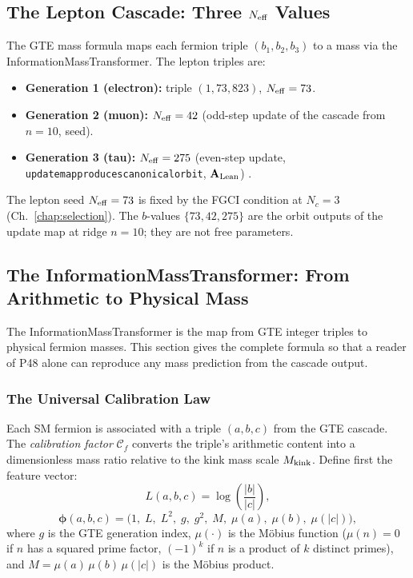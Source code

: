 \documentclass[11pt,openany]{book}
\theoremstyle{remark}
\newcommand{\lean}[1]{%
  \penalty-100
  \begingroup\def\_{\textunderscore\allowbreak}\texttt{#1}\endgroup}
\newcommand{\Mkink}{M_{\rm kink}}
\newcommand{\Nc}{N_c}
\newcommand{\CatAL}{\ensuremath{\textbf{A}_{\rm Lean}}}
\begin{document}
\subsection*{The Lepton Cascade: Three $N_{\rm eff}$ Values}

The GTE mass formula maps each fermion triple $(b_1, b_2, b_3)$ to a mass via the
InformationMassTransformer.  The lepton triples are:
\begin{itemize}[nosep]
\item \textbf{Generation 1 (electron):} triple $(1, 73, 823)$, $N_{\rm eff} = 73$.
\item \textbf{Generation 2 (muon):} $N_{\rm eff} = 42$ (odd-step update of the cascade
  from $n=10$, seed).
\item \textbf{Generation 3 (tau):} $N_{\rm eff} = 275$ (even-step update,
  \lean{update\_map\_produces\_canonical\_orbit}, \CatAL) \cite{Spivack2025UGP}.
\end{itemize}

The lepton seed $N_{\rm eff} = 73$ is fixed by the FGCI condition at $\Nc = 3$
(Ch.~\ref{chap:selection}).  The $b$-values $\{73, 42, 275\}$ are the orbit outputs
of the update map at ridge $n = 10$; they are not free parameters.

\subsection*{The InformationMassTransformer: From Arithmetic to Physical Mass}
\label{subsec:imt_formula}

The InformationMassTransformer is the map from GTE integer triples to physical fermion
masses.  This section gives the complete formula so that a reader of P48 alone can
reproduce any mass prediction from the cascade output.

\subsubsection*{The Universal Calibration Law}

Each SM fermion is associated with a triple $(a, b, c)$ from the GTE cascade.  The
\emph{calibration factor} $\mathcal{C}_f$ converts the triple's arithmetic content into a
dimensionless mass ratio relative to the kink mass scale $\Mkink$.  Define first the
feature vector:
\begin{equation}
  L(a,b,c) = \log\!\left(\frac{|b|}{|c|}\right),
  \label{eq:ucl_L}
\end{equation}
\begin{equation}
  \boldsymbol{\phi}(a,b,c) = \bigl(1,\; L,\; L^2,\; g,\; g^2,\; M,\;
    \mu(a),\; \mu(b),\; \mu(|c|)\bigr),
  \label{eq:ucl_phi}
\end{equation}
where $g$ is the GTE generation index, $\mu(\cdot)$ is the M\"obius function
($\mu(n) = 0$ if $n$ has a squared prime factor, $(-1)^k$ if $n$ is a product of $k$
distinct primes), and $M = \mu(a)\,\mu(b)\,\mu(|c|)$ is the M\"obius product.
\end{document}
